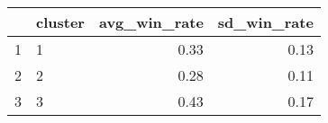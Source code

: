 \begin{table}[ht]
\centering
\begin{tabular}{rlrr}
  \hline
 & cluster & avg\_win\_rate & sd\_win\_rate \\ 
  \hline
1 & 1 & 0.33 & 0.13 \\ 
  2 & 2 & 0.28 & 0.11 \\ 
  3 & 3 & 0.43 & 0.17 \\ 
   \hline
\end{tabular}
\end{table}
